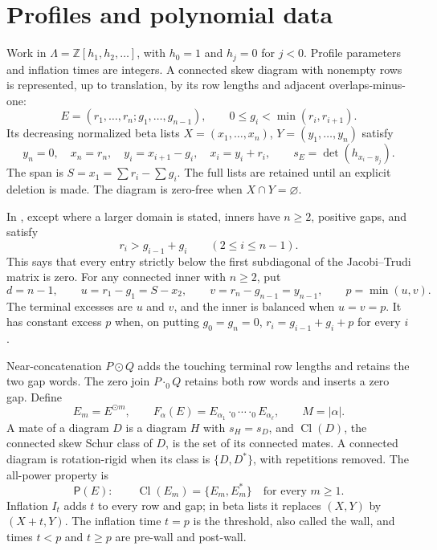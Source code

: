 \documentclass[11pt,a4paper]{amsart}
\numberwithin{equation}{section}
\theoremstyle{plain}
\theoremstyle{definition}
\begin{document}
\section{Profiles and polynomial data}\label{sec:profiles}

Work in \(\Lambda=\mathbb Z[h_1,h_2,\ldots]\), with \(h_0=1\) and \(h_j=0\) for \(j<0\).  Profile parameters and inflation times are integers.  A connected skew diagram with nonempty rows is represented, up to translation, by its row lengths and adjacent overlaps-minus-one:
\begin{equation}\label{eq:profile}
 E=(r_1,\ldots,r_n;g_1,\ldots,g_{n-1}),\qquad
 0\le g_i<\min(r_i,r_{i+1}).
\end{equation}
Its decreasing normalized beta lists \(X=(x_1,\ldots,x_n)\), \(Y=(y_1,\ldots,y_n)\) satisfy
\begin{equation}\label{eq:beta}
 y_n=0,\quad x_n=r_n,\quad y_i=x_{i+1}-g_i,\quad
 x_i=y_i+r_i,\qquad s_E=\det(h_{x_i-y_j}).
\end{equation}
The span is \(S=x_1=\sum r_i-\sum g_i\).  The full lists are retained until an explicit deletion is made.  The diagram is zero-free when \(X\cap Y=\varnothing\).

In , except where a larger domain is stated, inners have \(n\ge2\), positive gaps, and satisfy
\begin{equation}\label{eq:hessenberg}
 r_i>g_{i-1}+g_i\qquad(2\le i\le n-1).
\end{equation}
This says that every entry strictly below the first subdiagonal of the Jacobi--Trudi matrix is zero.  For any connected inner with \(n\ge2\), put
\begin{equation}\label{eq:terminal}
 d=n-1,\qquad u=r_1-g_1=S-x_2,\qquad
 v=r_n-g_{n-1}=y_{n-1},\qquad p=\min(u,v).
\end{equation}
The terminal excesses are \(u\) and \(v\), and the inner is balanced when \(u=v=p\).  It has constant excess \(p\) when, on putting \(g_0=g_n=0\),
\(r_i=g_{i-1}+g_i+p\) for every \(i\).

Near-concatenation \(P\odot Q\) adds the touching terminal row lengths and retains the two gap words.  The zero join \(P\cdot_0Q\) retains both row words and inserts a zero gap.  Define
\begin{equation}\label{eq:composite}
 E_m=E^{\odot m},\qquad
 F_\alpha(E)=E_{\alpha_1}\cdot_0\cdots\cdot_0E_{\alpha_\ell},
 \qquad M=|\alpha|.
\end{equation}
A mate of a diagram \(D\) is a diagram \(H\) with \(s_H=s_D\), and \(\operatorname{Cl}(D)\), the connected skew Schur class of \(D\), is the set of its connected mates.  A connected diagram is rotation-rigid when its class is \(\{D,D^*\}\), with repetitions removed.  The all-power property is
\begin{equation}\label{eq:power-property}
 \mathsf P(E):\qquad
 \operatorname{Cl}(E_m)=\{E_m,E_m^*\}\quad\text{for every }m\ge1.
\end{equation}
Inflation \(I_t\) adds \(t\) to every row and gap; in beta lists it replaces \((X,Y)\) by \((X+t,Y)\).  The inflation time \(t=p\) is the threshold, also called the wall, and times \(t<p\) and \(t\ge p\) are pre-wall and post-wall.
\end{document}
